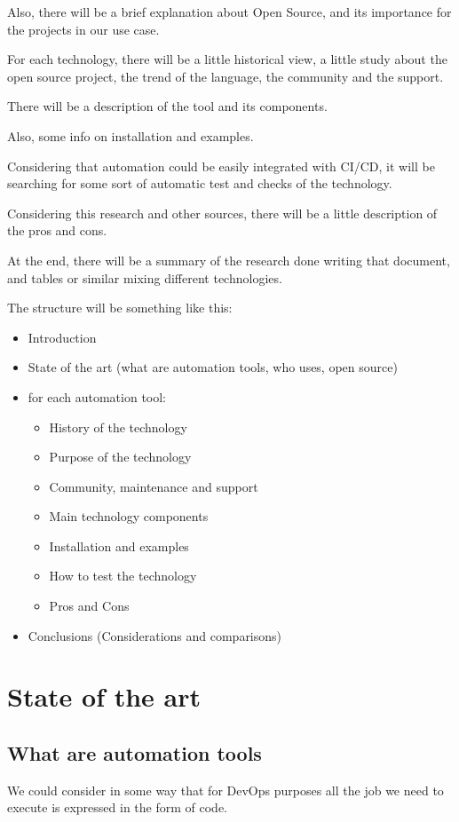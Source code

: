 \documentclass[12pt,a4paper,openright,twoside]{book}
\begin{document}
Also, there will be a brief explanation about Open Source, and its importance for the projects in our use case.


For each technology, there will be a little historical view, a little study about the open source project, the trend of the language, the community and the support.


There will be a description of the tool and its components.


Also, some info on installation and examples.


Considering that automation could be easily integrated with CI/CD, it will be searching for some sort of automatic test and checks of the technology.


Considering this research and other sources, there will be a little description of the pros and cons.


At the end, there will be a summary of the research done writing that document, and tables or similar mixing different technologies.

The structure will be something like this:

\begin{itemize}
    \item Introduction
    \item State of the art (what are automation tools, who uses, open source)
    \item for each automation tool:
    \begin{itemize}
    \item History of the technology
    \item Purpose of the technology
    \item Community, maintenance and support
    \item Main technology components
    \item Installation and examples
    \item How to test the technology
    \item Pros and Cons
    \end{itemize}
    \item Conclusions (Considerations and comparisons)
\end{itemize}


\chapter{State of the art}

\section{What are automation tools}
We could consider in some way that for DevOps purposes all the job we need to execute is expressed in the form of code\cite{learnDevOps}.
\end{document}
